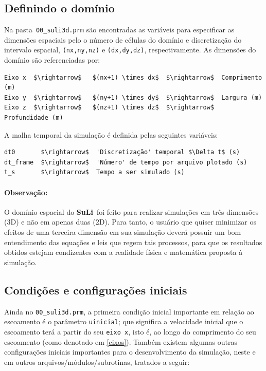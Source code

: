 \documentclass[12pt, a4paper]{article}
\newcommand{\SL}{{\bf SuLi}}
\begin{document}
\subsection{Definindo o domínio}

Na pasta \,\verb|00_suli3d.prm| são encontradas as variáveis para especificar as dimensões espaciais pelo o número de células do domínio e discretização do intervalo espacial, \verb|(nx,ny,nz)| e \verb|(dx,dy,dz)|, respectivamente. As dimensões do domínio são referenciadas por:
\begin{lstlisting}
Eixo x  $\rightarrow$   $(nx+1) \times dx$  $\rightarrow$  Comprimento (m)
Eixo y  $\rightarrow$   $(ny+1) \times dy$  $\rightarrow$  Largura (m)
Eixo z	$\rightarrow$   $(nz+1) \times dz$  $\rightarrow$  Profundidade (m)
\end{lstlisting}	\label{eixos}

A malha temporal da simulação é definida pelas seguintes variáveis:
\begin{lstlisting}
dt0       $\rightarrow$  'Discretização' temporal $\Delta t$ (s)
dt_frame  $\rightarrow$  'Número' de tempo por arquivo plotado (s)
t_s       $\rightarrow$  Tempo a ser simulado (s)
\end{lstlisting}

\paragraph{Observação:} O domínio espacial do \SL\ foi feito para realizar simulações em três dimensões (3D) e não em apenas duas (2D). Para tanto, o usuário que quiser minimizar os efeitos de uma terceira dimensão em sua simulação deverá possuir um bom entendimento das equações e leis que regem tais processos, para que os resultados obtidos estejam condizentes com a realidade física e matemática proposta à simulação.

\newpage

\subsection{Condições e configurações iniciais}
Ainda no \verb|00_suli3d.prm|, a primeira condição inicial importante em relação ao escoamento é o parâmetro \verb|uinicial|; que significa a velocidade inicial que o escoamento terá a partir do seu \verb|eixo x|, isto é, ao longo do comprimento do seu escoamento (como denotado em \ref{eixos}). Também existem algumas outras configurações iniciais importantes para o desenvolvimento da simulação, neste e em outros arquivos/módulos/subrotinas, tratados a seguir:
\end{document}
